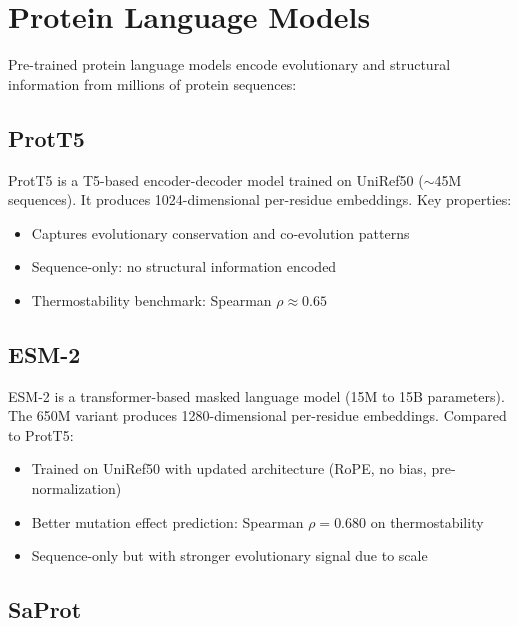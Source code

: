 \section{Protein Language Models}

Pre-trained protein language models encode evolutionary and structural information from millions of protein sequences:

\subsection{ProtT5}

ProtT5 \cite{elnaggar2022prottrans} is a T5-based encoder-decoder model trained on UniRef50 ($\sim$45M sequences). It produces 1024-dimensional per-residue embeddings. Key properties:
\begin{itemize}
    \item Captures evolutionary conservation and co-evolution patterns
    \item Sequence-only: no structural information encoded
    \item Thermostability benchmark: Spearman $\rho \approx 0.65$
\end{itemize}

\subsection{ESM-2}

ESM-2 \cite{lin2023evolutionary} is a transformer-based masked language model (15M to 15B parameters). The 650M variant produces 1280-dimensional per-residue embeddings. Compared to ProtT5:
\begin{itemize}
    \item Trained on UniRef50 with updated architecture (RoPE, no bias, pre-normalization)
    \item Better mutation effect prediction: Spearman $\rho = 0.680$ on thermostability
    \item Sequence-only but with stronger evolutionary signal due to scale
\end{itemize}

\subsection{SaProt}

